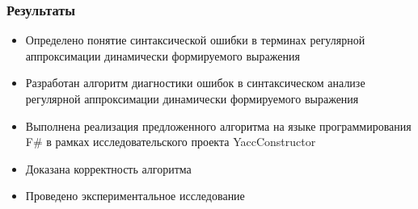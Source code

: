 \documentclass{beamer}
\begin{document}



\begin{frame}
  \transwipe[direction=90]
  \frametitle{Результаты}
  \begin{itemize}
    \item Определено понятие синтаксической ошибки в терминах регулярной аппроксимации динамически формируемого выражения
    \item Разработан алгоритм диагностики ошибок в синтаксическом анализе регулярной аппроксимации динамически формируемого выражения
    \item Выполнена реализация предложенного алгоритма на языке программирования F\# в рамках исследовательского проекта YaccConstructor
    \item Доказана корректность алгоритма
    \item Проведено экспериментальное исследование
  \end{itemize}
\end{frame}
\end{document}
